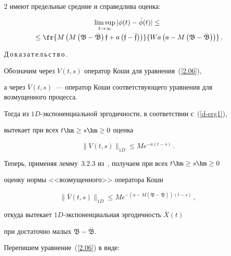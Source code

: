 \begin{multicols}{2}
{имеют предельные средние и справедлива оценка}:

\begin{multline}

\limsup_{t \to \infty}  |\phi(t) - \bar{\phi}(t)|\le{}\\

{}\le

\fr{M\left(M\left(\mathfrak{B-\bar{B}}\right) \mathfrak{f}  +

a\left(\mathfrak{f-\bar{f}}\right)\right)}{Wa\left(a -

M\left(\mathfrak{B-\bar{B}}\right)\right)}\,.

\label{3003}

\end{multline}



\noindent

Д\,о\,к\,а\,з\,а\,т\,е\,л\,ь\,с\,т\,в\,о\,.\ \

Обозначим через  $V(t, s)$ оператор Коши для уравнения~(\ref{2.06}),

а через  $\bar{V}(t, s)$~--- оператор Коши соответствующего уравнения для возмущенного процесса.

Тогда из $1D$-экс\-по\-нен\-ци\-аль\-ной эргодичности, в соответствии с~(\ref{d-erg1}),

вытекает при всех $t \hm\ge s \hm\ge 0$ оценка

\begin{equation*}

\|V(t,s)\|_{1D} \le   M e^{-a(t-s)}\,.


\end{equation*}

Теперь, применяя лемму~3.2.3 из~\cite{DK}, получаем при всех $t \hm\ge s \hm\ge 0$

оценку нормы <<возмущенного>> оператора Коши

\begin{equation*}

\|\bar{V}(t,s)\|_{1D} \le   M e^{-\left(a - M\left(\mathfrak{B-\bar{B}}\right)\right)(t-s)}\,,


\end{equation*}

откуда вытекает  $1D$-экс\-по\-нен\-ци\-аль\-ная эргодичность  $\bar{X}(t)$

при достаточно малых $\mathfrak{B-\bar{B}}$.

Перепишем уравнение~(\ref{2.06}) в виде:


\end{multicols}
